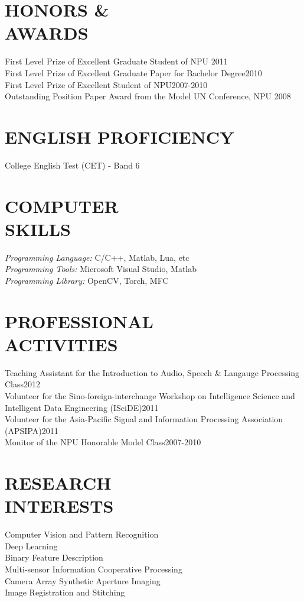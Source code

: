 \documentclass[margin]{res}
\begin{document}
\begin{resume}
\section{HONORS  \& \\AWARDS}
                First Level Prize of Excellent Graduate Student of NPU \hfill 2011\\
                First Level Prize of Excellent Graduate Paper for Bachelor Degree\hfill 2010\\
                First Level Prize of Excellent Student of NPU\hfill 2007-2010\\
                Outstanding Position Paper Award from the Model UN Conference, NPU \hfill 2008

\section{ENGLISH PROFICIENCY}
                College English Test (CET) - Band 6

\section{COMPUTER \\ SKILLS} {\sl Programming Language:} C/C++, Matlab, Lua, etc\\
                {\sl Programming Tools:} Microsoft Visual Studio, Matlab\\
                {\sl Programming Library:} OpenCV, Torch, MFC

\section{PROFESSIONAL\\ACTIVITIES}
                Teaching Assistant for the Introduction to Audio, Speech \& Langauge Processing Class\hfill 2012\\
                Volunteer for the Sino-foreign-interchange Workshop on Intelligence Science and Intelligent Data Engineering (ISciDE)\hfill 2011\\
                Volunteer for the Asia-Pacific Signal and Information Processing Association (APSIPA)\hfill 2011\\
                Monitor of the NPU Honorable Model Class\hfill 2007-2010

\section{RESEARCH \\INTERESTS}
                Computer Vision and Pattern Recognition\\
                Deep Learning\\
                Binary Feature Description\\
                Multi-sensor Information Cooperative Processing\\
                Camera Array Synthetic Aperture Imaging\\
                Image Registration and Stitching


\end{resume}
\end{document}
